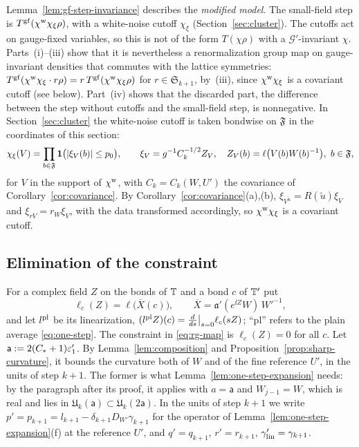 Lemma~\ref{lem:gf-step-invariance} describes the \emph{modified model}. The small-field step is $T^{\rm gf}(\chi^{\rm w}\chi_\xi\rho)$, with a white-noise cutoff $\chi_\xi$ (Section~\ref{sec:cluster}). The cutoffs act on gauge-fixed variables, so this is not of the form $T(\chi\rho)$ with a $\mathcal G'$-invariant $\chi$. Parts~(i)--(iii) show that it is nevertheless a renormalization group map on gauge-invariant densities that commutes with the lattice symmetries: $T^{\rm gf}(\chi^{\rm w}\chi_\xi\cdot r\rho)=r\,T^{\rm gf}(\chi^{\rm w}\chi_\xi\rho)$ for $r\in\mathfrak S_{k+1}$, by~(iii), since $\chi^{\rm w}\chi_\xi$ is a covariant cutoff (see below). Part~(iv) shows that the discarded part, the difference between the step without cutoffs and the small-field step, is nonnegative. In Section~\ref{sec:cluster} the white-noise cutoff is taken bondwise on $\mathfrak F$ in the coordinates of this section:
\[
\chi_\xi(V)=\prod_{b\in\mathfrak F}\mathbf 1\big(|\xi_V(b)|\le p_0\big),\qquad\xi_V=g^{-1}C_k^{-1/2}Z_V,\quad Z_V(b)=\ell\big(V(b)W(b)^{-1}\big),\ b\in\mathfrak F,
\]
for $V$ in the support of $\chi^{\rm w}$, with $C_k=C_k(W,U')$ the covariance of Corollary~\ref{cor:covariance}. By Corollary~\ref{cor:covariance}(a),(b), $\xi_{V^{\tilde u}}=R(\tilde u)\xi_V$ and $\xi_{rV}=r_W\xi_V$, with the data transformed accordingly, so $\chi^{\rm w}\chi_\xi$ is a covariant cutoff.

\subsection{Elimination of the constraint}\label{ss:32.4}

For a complex field $Z$ on the bonds of $\mathbb T$ and a bond $c$ of $\mathbb T'$ put
\[
\ell_c(Z)=\ell\big(\overline X(c)\big),\qquad\overline X=\mathfrak a'(e^{\ii Z}W)\,W'^{-1},
\]
and let $l^{\rm pl}$ be its linearization, $(l^{\rm pl}Z)(c)=\frac{d}{ds}\big|_{s=0}\ell_c(sZ)$; ``pl'' refers to the plain average \eqref{eq:one-step}. The constraint in \eqref{eq:rg-map} is $\ell_c(Z)=0$ for all $c$. Let $\mathsf a:=2(C_*+1)\varepsilon'_1$. By Lemma~\ref{lem:composition} and Proposition~\ref{prop:sharp-curvature}, it bounds the curvature both of $W$ and of the fine reference $U'$, in the units of step $k+1$. The former is what Lemma~\ref{lem:one-step-expansion} needs: by the paragraph after its proof, it applies with $a=\mathsf a$ and $W_{j-1}=W$, which is real and lies in $\mathfrak U_k(\mathsf a)\subset\mathfrak U_k(2\mathsf a)$. In the units of step $k+1$ we write $p'=p_{k+1}=l_{k+1}-\delta_{k+1}D_{W'}\gamma_{k+1}$ for the operator of Lemma~\ref{lem:one-step-expansion}(f) at the reference $U'$, and $q'=q_{k+1}$, $r'=r_{k+1}$, $\gamma'_{\rm lin}=\gamma_{k+1}$.

